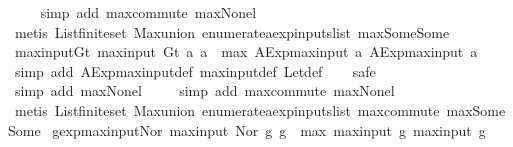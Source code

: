 \begin{isabellebody}
\ \ \ \isamarkupfalse%
\ {\isacharparenleft}simp\ add{\isacharcolon}\ max{\isachardot}commute\ max{\isacharunderscore}None{\isacharunderscore}l{\isacharparenright}\isanewline
\ \ \isamarkupfalse%
\ {\isacharparenleft}metis\ List{\isachardot}finite{\isacharunderscore}set\ Max{\isachardot}union\ enumerate{\isacharunderscore}aexp{\isacharunderscore}inputs{\isacharunderscore}list\ max{\isacharunderscore}Some{\isacharunderscore}Some{\isacharparenright}%
\endisatagproof
{\isafoldproof}%
%
\isadelimproof
\isanewline
%
\endisadelimproof
\isanewline
{}\isamarkupfalse%
\ max{\isacharunderscore}input{\isacharunderscore}Gt{\isacharcolon}\ {\isachardoublequoteopen}max{\isacharunderscore}input\ {\isacharparenleft}Gt\ a{}\ a{}{\isacharparenright}\ {\isacharequal}\ max\ {\isacharparenleft}AExp{\isachardot}max{\isacharunderscore}input\ a{}{\isacharparenright}\ {\isacharparenleft}AExp{\isachardot}max{\isacharunderscore}input\ a{}{\isacharparenright}{\isachardoublequoteclose}\isanewline
%
\isadelimproof
\ \ %
\endisadelimproof
%
\isatagproof
{}\isamarkupfalse%
\ {\isacharparenleft}simp\ add{\isacharcolon}\ AExp{\isachardot}max{\isacharunderscore}input{\isacharunderscore}def\ max{\isacharunderscore}input{\isacharunderscore}def\ Let{\isacharunderscore}def{\isacharparenright}\isanewline
\ \ \isamarkupfalse%
\ safe\isanewline
\ \ \ \ \isamarkupfalse%
\ {\isacharparenleft}simp\ add{\isacharcolon}\ max{\isacharunderscore}None{\isacharunderscore}l{\isacharparenright}\isanewline
\ \ \ \isamarkupfalse%
\ {\isacharparenleft}simp\ add{\isacharcolon}\ max{\isachardot}commute\ max{\isacharunderscore}None{\isacharunderscore}l{\isacharparenright}\isanewline
\ \ \isamarkupfalse%
\ {\isacharparenleft}metis\ List{\isachardot}finite{\isacharunderscore}set\ Max{\isachardot}union\ enumerate{\isacharunderscore}aexp{\isacharunderscore}inputs{\isacharunderscore}list\ max{\isachardot}commute\ max{\isacharunderscore}Some{\isacharunderscore}Some{\isacharparenright}%
\endisatagproof
{\isafoldproof}%
%
\isadelimproof
\isanewline
%
\endisadelimproof
\isanewline
{}\isamarkupfalse%
\ gexp{\isacharunderscore}max{\isacharunderscore}input{\isacharunderscore}Nor{\isacharcolon}\ {\isachardoublequoteopen}max{\isacharunderscore}input\ {\isacharparenleft}Nor\ g{}\ g{}{\isacharparenright}\ {\isacharequal}\ max\ {\isacharparenleft}max{\isacharunderscore}input\ g{}{\isacharparenright}\ {\isacharparenleft}max{\isacharunderscore}input\ g{}{\isacharparenright}{\isachardoublequoteclose}\isanewline

\end{isabellebody}
